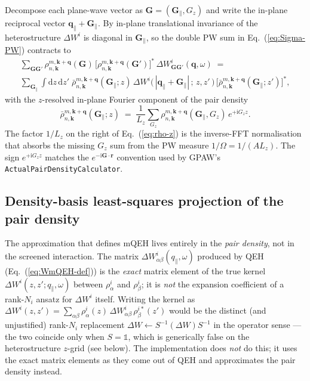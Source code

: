 \documentclass[11pt,a4paper]{article}
\newcommand{\rr}{\mathbf{r}}
\newcommand{\qq}{\mathbf{q}}
\newcommand{\GG}{\mathbf{G}}
\newcommand{\kk}{\mathbf{k}}
\newcommand{\Gpar}{\mathbf{G}_{\!\parallel}}
\newcommand{\qpar}{\mathbf{q}_{\parallel}}
\newcommand{\Gz}{G_{z}}
\newcommand{\dd}{\mathrm{d}}
\newcommand{\im}{\mathrm{i}}
\newcommand{\eq}[1]{Eq.~(\ref{eq:#1})}
\begin{document}
Decompose each plane-wave vector as $\GG=(\Gpar,\Gz)$ and write the
in-plane reciprocal vector $\qpar+\Gpar$.  By in-plane translational
invariance of the heterostructure $\Delta W^i$ is diagonal in
$\Gpar$, so the double PW sum in \eq{Sigma-PW} contracts to
\begin{multline}
\sum_{\GG\GG'}\rho^{m,\kk+\qq}_{n,\kk}(\GG)\,
\bigl[\rho^{m,\kk+\qq}_{n,\kk}(\GG')\bigr]^{*}\,
\Delta W^{i}_{\GG\GG'}(\qq,\omega)
\;=\\
\sum_{\Gpar}
\int\!\dd z\,\dd z'\;
\bar\rho^{m,\kk+\qq}_{n,\kk}(\Gpar;z)\,
\Delta W^{i}\!\bigl(\,|\qpar+\Gpar|\,;\,z,z'\,\bigr)\,
\bigl[\bar\rho^{m,\kk+\qq}_{n,\kk}(\Gpar;z')\bigr]^{*},
\label{eq:GGsum-to-zz}
\end{multline}
with the $z$-resolved in-plane Fourier component of the pair density
\begin{equation}
\bar\rho^{m,\kk+\qq}_{n,\kk}(\Gpar;z) \;=\;
\frac{1}{L_z}\sum_{\Gz}
\rho^{m,\kk+\qq}_{n,\kk}(\Gpar,\Gz)\, e^{+\im\Gz z}.
\label{eq:rho-z}
\end{equation}
The factor $1/L_z$ on the right of \eq{rho-z} is the inverse-FFT
normalisation that absorbs the missing $\Gz$ sum from the PW measure
$1/\Omega = 1/(AL_z)$.  The sign $e^{+\im\Gz z}$ matches the
$e^{-\im\GG\!\cdot\!\rr}$ convention used by GPAW's
\texttt{ActualPairDensityCalculator}.

\subsection{Density-basis least-squares projection of the pair density}
\label{sec:LS}

The approximation that defines mQEH lives entirely in the
\emph{pair density}, not in the screened interaction.  The matrix
$\Delta W^{i}_{\alpha\beta}(q_\parallel,\omega)$ produced by QEH
(\eq{WmQEH-def}) is the \emph{exact} matrix element of the true
kernel $\Delta W^{i}(z,z';q_\parallel,\omega)$ between
$\rho^{i}_{\alpha}$ and $\rho^{i}_{\beta}$; it is \emph{not} the
expansion coefficient of a rank-$N_i$ ansatz for $\Delta W^{i}$
itself.  Writing the kernel as
$\Delta W^{i}(z,z')=\sum_{\alpha\beta}\rho^{i}_{\alpha}(z)\,
\Delta W^{i}_{\alpha\beta}\,\rho^{i*}_{\beta}(z')$ would be the
distinct (and unjustified) rank-$N_i$ replacement
$\Delta W\leftarrow S^{-1}(\Delta W)S^{-1}$ in the operator sense ---
the two coincide only when $S=\mathbb{1}$, which is generically false
on the heterostructure $z$-grid (see below).  The implementation does
\emph{not} do this; it uses the exact matrix elements as they come
out of QEH and approximates the pair density instead.
\end{document}

